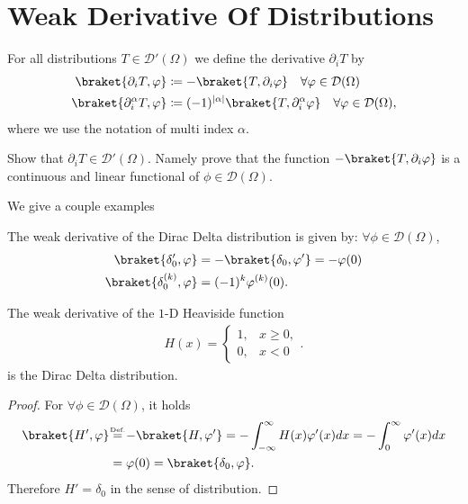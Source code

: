 \section{Weak Derivative Of Distributions}
\begin{definition}
 For all distributions  $T \in  \mathcal{D}'(\Omega )$  we define the derivative $\partial_i T$ by 
 \begin{align*}
   \braket{\partial_i T,\phi } &\coloneqq -\braket{T,\partial_i \phi } \quad \forall \phi  \in \mathcal{D}(\Omega)\\
   \braket{\partial_i^{\alpha }  T,\phi } &\coloneqq (-1)^{\abs{\alpha }} \braket{T,\partial_i^{\alpha }  \phi } \quad \forall \phi  \in \mathcal{D}(\Omega),
\end{align*}
where we use the notation of multi index $\alpha $.
\end{definition}
\begin{exercise}
 Show that $\partial_i T\in \mathcal{D}'(\Omega )$. Namely prove that the function $-\braket{T,\partial_i \phi }$  is a continuous and linear functional of $\phi\in\mathcal{D}(\Omega )$.  
\end{exercise}
We give a couple examples 
\begin{example}
 The weak derivative of the Dirac Delta distribution is given by:  $\forall \phi  \in  \mathcal{D}(\Omega )$,
 \begin{align*}
   \braket{\delta'_0,\phi } &= - \braket{\delta_0,\phi'} = -\phi(0)\\
   \braket{\delta_0^{(k)},\phi  } &= (-1)^{k} \phi ^{(k)}  (0)
 .\end{align*}
\end{example}
\begin{lemma}
 The weak derivative of the $1$-D Heaviside function 
 \begin{align*}
  H(x) = \begin{cases}
    1, &x\ge 0,\\
    0,&x<0
  \end{cases}
 .\end{align*}
 is the Dirac Delta distribution.
\end{lemma}
\begin{proof}
 For $\forall  \phi  \in \mathcal{D}(\Omega )$,  it holds 
 \begin{align*}
   \braket{H',\phi } &\myS{Def.}{=} -\braket{H,\phi'}= - \int_{-\infty}^{\infty} H(x)\phi'(x)  dx = - \int_0^{\infty} \phi'(x) dx \\
                     &= \phi(0) = \braket{\delta_0,\phi }
 .\end{align*}
 Therefore  $ H' = \delta_0$ in the sense of distribution.
\end{proof}

